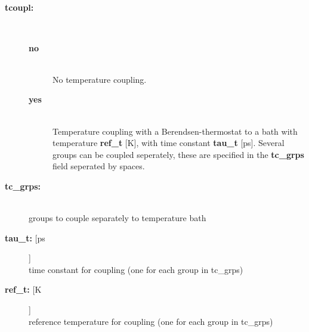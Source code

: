 \subsection{}
\begin{description}
\item[{\bf tcoupl:}]\mbox{}\\
\vspace{-2ex}\begin{description}
\item[{\bf no}]\mbox{}\\
No temperature coupling. 
\item[{\bf yes}]\mbox{}\\
Temperature coupling with a Berendsen-thermostat to a bath with
temperature {\bf ref\_t} [K], with time constant {\bf tau\_t} [ps].
Several groups can be coupled seperately, these are specified in the
{\bf tc\_grps} field seperated by spaces.
\end{description}
\item[{\bf tc\_grps:}]\mbox{}\\
groups to couple separately to temperature bath
\item[{\bf tau\_t: }[ps]]\mbox{}\\
time constant for coupling (one for each group in tc\_grps)
\item[{\bf ref\_t: }[K]]\mbox{}\\
reference temperature for coupling (one for each group in tc\_grps)
\end{description}

